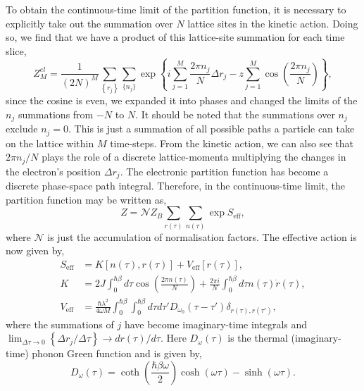 To obtain the continuous-time limit of the partition function, it is necessary to explicitly take out the summation over $N$ lattice sites in the kinetic action. Doing so, we find that we have a product of this lattice-site summation for each time slice,
\begin{equation}
    Z^{el}_M = \frac{1}{(2N)^M} \sum_{\left\{r_j\right\}} \sum_{\{n_j\}} \exp\left\{i \sum_{j=1}^M \frac{2 \pi n_j}{N} \Delta r_j - z \sum_{j=1}^M \cos(\frac{2 \pi n_j}{N})\right\} ,
\end{equation}
since the cosine is even, we expanded it into phases and changed the limits of the $n_j$ summations from $-N$ to $N$. It should be noted that the summations over $n_j$ exclude $n_j = 0$. This is just a summation of all possible paths a particle can take on the lattice within $M$ time-steps. From the kinetic action, we can also see that $2\pi n_j / N$ plays the role of a discrete lattice-momenta multiplying the changes in the electron's position $\Delta r_j$. The electronic partition function has become a discrete phase-space path integral. Therefore, in the continuous-time limit, the partition function may be written as,
\begin{equation}
    Z = \mathcal{N} Z_B \sum_{r(\tau)} \sum_{n(\tau)} \exp{S_{\text{eff}}} ,
\end{equation}
where $\mathcal{N}$ is just the accumulation of normalisation factors. The effective action is now given by,
\begin{equation}
    \begin{aligned}
        S_{\text{eff}} &= K[n(\tau), r(\tau)] + V_{\text{eff}}[r(\tau)] , \\
        K &= 2J \int_0^{\hbar\beta} d\tau \cos{\left(\frac{2\pi n(\tau)}{N}\right)} + \frac{2\pi i}{N} \int_0^{\hbar\beta} d\tau n(\tau) \Dot{r}(\tau) , \\
        V_{\text{eff}} &= \frac{\hbar \lambda^2}{4 \omega M} \int_0^{\hbar\beta} \int_0^{\hbar\beta} d\tau d\tau' D_{\omega_0}(\tau - \tau') \delta_{r(\tau), r(\tau')} ,
    \end{aligned}
\end{equation}
where the summations of $j$ have become imaginary-time integrals and $\lim_{\Delta\tau \to 0} \left\{\Delta r_j / \Delta \tau\right\} \rightarrow d r(\tau) / d\tau$. Here $D_{\omega}(\tau)$ is the thermal (imaginary-time) phonon Green function  and is given by,
\begin{equation} \label{eqn:phonongf}
    D_{\omega}(\tau) = \coth(\frac{\hbar\beta\omega}{2}) \cosh(\omega \tau) - \sinh(\omega\tau).
\end{equation}
